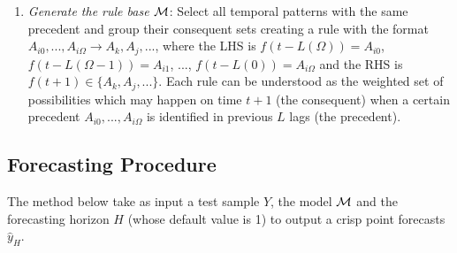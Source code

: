 \begin{enumerate}
\begin{enumerate}
\item \textit{Generate the rule base $\mathcal{M}$}: Select all temporal patterns with the same precedent and group their consequent sets  creating a rule with the format $A_{i0},...,A_{i\Omega} \rightarrow  A_k, A_j,...$, where the LHS is $f(t - L(\Omega)) = A_{i0}$, $f(t - L(\Omega-1)) = A_{i1}$, ..., $f(t - L(0)) = A_{i\Omega}$ and the RHS is $f(t+1) \in \{A_k, A_j,...\}$. Each rule can be understood as the weighted set of possibilities which may happen on time $t+1$ (the consequent) when a certain precedent $A_{i0},...,A_{i\Omega}$ is identified in previous $L$ lags (the precedent).
\end{enumerate}
\end{enumerate}

%
\subsection{Forecasting Procedure} 
\label{sec:fts_forecasting_procedure}

The method below take as input a test sample $Y$, the model $\mathcal{M}$ and the forecasting horizon $H$ (whose default value is 1) to output a crisp point forecasts $\hat{y}_H$.

